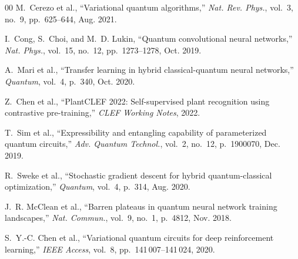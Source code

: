 \documentclass[conference]{IEEEtran}
\begin{document}
\begin{thebibliography}{00}
M.~Cerezo et al., ``Variational quantum algorithms,'' \textit{Nat. Rev. Phys.}, vol.~3, no.~9, pp.~625--644, Aug. 2021.

I.~Cong, S.~Choi, and M.~D. Lukin, ``Quantum convolutional neural networks,'' \textit{Nat. Phys.}, vol.~15, no.~12, pp.~1273--1278, Oct. 2019.

A.~Mari et al., ``Transfer learning in hybrid classical-quantum neural networks,'' \textit{Quantum}, vol.~4, p.~340, Oct. 2020.

Z.~Chen et al., ``PlantCLEF 2022: Self-supervised plant recognition using contrastive pre-training,'' \textit{CLEF Working Notes}, 2022.

T.~Sim et al., ``Expressibility and entangling capability of parameterized quantum circuits,'' \textit{Adv. Quantum Technol.}, vol.~2, no.~12, p.~1900070, Dec. 2019.

R.~Sweke et al., ``Stochastic gradient descent for hybrid quantum-classical optimization,'' \textit{Quantum}, vol.~4, p.~314, Aug. 2020.

J.~R. McClean et al., ``Barren plateaus in quantum neural network training landscapes,'' \textit{Nat. Commun.}, vol.~9, no.~1, p.~4812, Nov. 2018.

S.~Y.-C. Chen et al., ``Variational quantum circuits for deep reinforcement learning,'' \textit{IEEE Access}, vol.~8, pp.~141\,007--141\,024, 2020.

\end{thebibliography}
\end{document}
